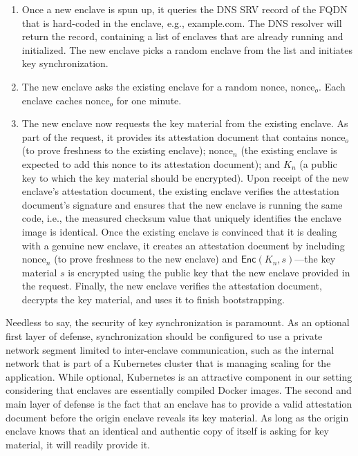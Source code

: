 \begin{enumerate}

  \item Once a new enclave is spun up, it queries the DNS SRV record of the FQDN
    that is hard-coded in the enclave, e.g., example.com.  The DNS resolver will
    return the record, containing a list of enclaves that are already running and initialized.
    The new enclave picks a random enclave from the list and initiates key
    synchronization.

  \item The new enclave asks the existing enclave for a random nonce,
    $\textrm{nonce}_o$.  Each enclave caches $\textrm{nonce}_o$ for one
    minute.

  \item The new enclave now requests the key material from the existing enclave.
    As part of the request, it provides its attestation document that contains
    $\textrm{nonce}_o$ (to prove freshness to the existing enclave);
    $\textrm{nonce}_n$ (the existing enclave is expected to add this nonce to its
    attestation document); and $K_n$ (a public key to which the key material
    should be encrypted).  Upon receipt of the new enclave's attestation
    document, the existing enclave verifies the attestation document's signature
    and ensures that the new enclave is running the same code, i.e., the measured checksum
    value that uniquely identifies the enclave image is identical.  Once the existing
    enclave is convinced that it is dealing with a genuine new enclave, it
    creates an attestation document by including $\textrm{nonce}_n$ (to prove
    freshness to the new enclave) and $\textsf{Enc}(K_n, s)$---the key material
    $s$ is encrypted using the public key that the new enclave provided in the
    request.  Finally, the new enclave verifies the attestation document,
    decrypts the key material, and uses it to finish bootstrapping.

\end{enumerate}

Needless to say, the security of key synchronization is paramount.  As an
optional first layer of defense, synchronization should be configured to use a
private network segment limited to inter-enclave communication, such as the
internal network that is part of a Kubernetes cluster that is managing scaling
for the application.  While optional, Kubernetes is an attractive component in
our setting considering that enclaves are essentially compiled Docker images.
The second and main layer of defense is the fact that an enclave has to provide
a valid attestation document before the origin enclave reveals its key material.
As long as the origin enclave knows that an identical and authentic copy of
itself is asking for key material, it will readily provide it.

